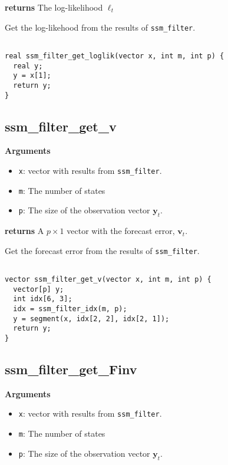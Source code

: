 \documentclass[]{book}
\providecommand{\tightlist}{%
  \setlength{\itemsep}{0pt}\setlength{\parskip}{0pt}}
\renewcommand{\vec}[1]{\boldsymbol{#1}}
\begin{document}
\textbf{returns} The log-likelihood \(\ell_t\)

Get the log-likehood from the results of \texttt{ssm\_filter}.

\begin{verbatim}

real ssm_filter_get_loglik(vector x, int m, int p) {
  real y;
  y = x[1];
  return y;
}

\end{verbatim}

\subsection{ssm\_filter\_get\_v}\label{ssm_filter_get_v}

\textbf{Arguments}

\begin{itemize}
\tightlist
\item
  \texttt{x}: vector with results from \texttt{ssm\_filter}.
\item
  \texttt{m}: The number of states
\item
  \texttt{p}: The size of the observation vector \(\vec{y}_t\).
\end{itemize}

\textbf{returns} A \(p \times 1\) vector with the forecast error,
\(\vec{v}_t\).

Get the forecast error from the results of \texttt{ssm\_filter}.

\begin{verbatim}

vector ssm_filter_get_v(vector x, int m, int p) {
  vector[p] y;
  int idx[6, 3];
  idx = ssm_filter_idx(m, p);
  y = segment(x, idx[2, 2], idx[2, 1]);
  return y;
}

\end{verbatim}

\subsection{ssm\_filter\_get\_Finv}\label{ssm_filter_get_finv}

\textbf{Arguments}

\begin{itemize}
\tightlist
\item
  \texttt{x}: vector with results from \texttt{ssm\_filter}.
\item
  \texttt{m}: The number of states
\item
  \texttt{p}: The size of the observation vector \(\vec{y}_t\).
\end{itemize}
\end{document}

